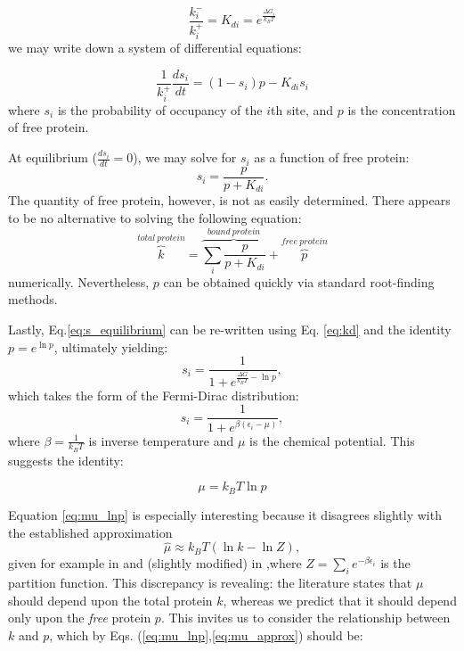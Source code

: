 \documentclass{article}
\begin{document}
\begin{equation}\label{eq:kd}
  \frac{k^-_i}{k^+_i} = K_{di} = e^{\frac{\Delta G_i}{k_BT}}
\end{equation}
we may write down a system of differential equations:

\begin{equation}
  \label{eq:s_diff}
  \frac{1}{k_i^+}\frac{ds_i}{dt} = (1-s_i)p - K_{di}s_i
\end{equation}
where $s_i$ is the probability of occupancy of the $i$th site, and $p$
is the concentration of free protein.

At equilibrium ($\frac{ds_i}{dt} = 0$), we may solve for $s_i$ as a
function of free protein:
\begin{equation}
  \label{eq:s_equilibrium}
  s_i = \frac{p}{p + K_{di}}.
\end{equation}
The quantity of free protein, however, is not as easily determined.
There appears to be no alternative to solving the following equation:
\begin{equation}
  \label{eq:p_numeric}
  \overset{total\ protein}{\overbrace{k}} = \overset{bound\ protein}{\overbrace{\displaystyle\sum_i\frac{p}{p + K_{di}}}} + \overset{free\ protein}{\overbrace{p}}
\end{equation}
numerically.  Nevertheless, $p$ can be obtained quickly via standard
root-finding methods.

Lastly, Eq.\ref{eq:s_equilibrium} can be re-written using
Eq. \ref{eq:kd} and the identity $p = e^{\ln p}$, ultimately yielding:
\begin{equation}
  \label{eq:s_fd}
  s_i = \frac{1}{1 + e^{\frac{\Delta G}{k_BT}  - \ln p}},
\end{equation}
which takes the form of the Fermi-Dirac distribution:
\begin{equation}
  \label{eq:s_fd}
  s_i = \frac{1}{1 + e^{\beta(\epsilon_i - \mu)}},
\end{equation}
where $\beta = \frac{1}{k_BT}$ is inverse temperature and $\mu$ is the
chemical potential.  This suggests the identity:

\begin{equation}
  \label{eq:mu_lnp}
  \mu = k_BT \ln p
\end{equation}

Equation \ref{eq:mu_lnp} is
especially interesting because it disagrees slightly with the
established approximation
\begin{equation}
  \label{eq:mu_approx}
  \hat{\mu} \approx k_BT (\ln k - \ln Z),
\end{equation}
given for example in \cite{gerland02} and (slightly modified) in
\cite{zhao09},where $Z=\sum_ie^{-\beta\epsilon_i}$ is the partition
function.  This discrepancy is revealing: the literature states that
$\mu$ should depend upon the total protein $k$, whereas we predict
that it should depend only upon the \textit{free} protein $p$.  This
invites us to consider the relationship between $k$ and $p$, which by
Eqs. (\ref{eq:mu_lnp},\ref{eq:mu_approx}) should be:
\end{document}
